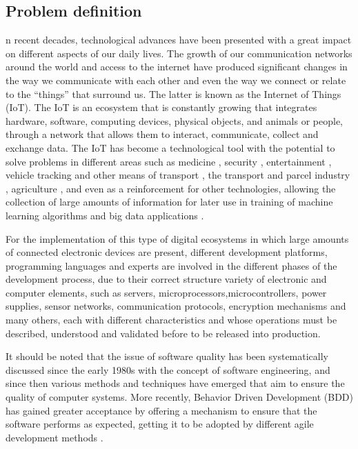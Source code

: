 \documentclass[journal]{IEEEtran}	%
\begin{document}
\subsection{Problem definition}

n recent decades, technological advances have been presented with a great impact on different aspects of our daily lives. The growth of our communication networks around the world and access to the internet have produced significant changes in the way we communicate with each other and even the way we connect or relate to the “things” that surround us. The latter is known as the Internet of Things (IoT). The IoT is an ecosystem that is constantly growing that integrates hardware, software, computing devices, physical objects, and animals or people, through a network that allows them to interact, communicate, collect and exchange data. The IoT has become a technological tool with the potential to solve problems in different areas such as medicine \cite{farahani2018towards,aktas2018iot,chen2015low}, security \cite{mao2018application}, entertainment \cite{kumar2019iot}, vehicle tracking and other means of transport \cite{lee2014design,jisha2017iot}, the transport and parcel industry \cite{caballero2013iot,li2017iot}, agriculture \cite{davcev2018iot,elijah2018overview}, and even as a reinforcement for other technologies, allowing the collection of large amounts of information for later use in training of machine learning algorithms and big data applications \cite{syafrudin2018performance,cai2016iot,luo2019development}.

For the implementation of this type of digital ecosystems in which large amounts of connected electronic devices are present, different development platforms, programming languages and experts are involved in the different phases of the development process, due to their correct structure variety of electronic and computer elements, such as servers, microprocessors,microcontrollers, power supplies, sensor networks, communication protocols, encryption mechanisms and many others, each with different characteristics and whose operations must be described, understood and validated before to be released into production.

It should be noted that the issue of software quality has been systematically discussed since the early 1980s with the concept of software engineering, and since then various methods and techniques have emerged that aim to ensure the quality of computer systems. More recently, Behavior Driven Development (BDD) has gained greater acceptance by offering a mechanism to ensure that the software performs as expected, getting it to be adopted by different agile development methods \cite{nascimento2020behavior}.
\end{document}
